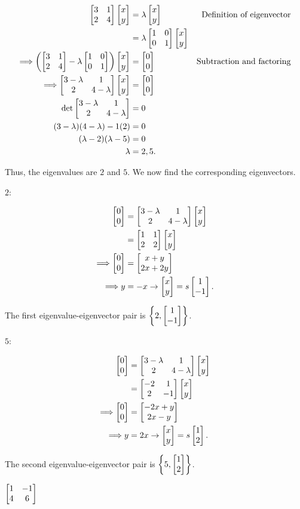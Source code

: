\documentclass[../gatm_answers.tex]{subfiles}
\begin{document}
\begin{align*}
\twomat{3}{1}{2}{4}\twovec{x}{y} &= \lambda\twovec{x}{y} & \text{Definition of eigenvector} \\
&= \lambda\twomat{1}{0}{0}{1}\twovec{x}{y} \\
\Longrightarrow \left(\twomat{3}{1}{2}{4}-\lambda\twomat{1}{0}{0}{1}\right)\twovec{x}{y}&=\twovec{0}{0} & \text{Subtraction and factoring} \\
\Longrightarrow \twomat{3-\lambda}{1}{2}{4-\lambda}\twovec{x}{y} &= \twovec{0}{0} \\
\det \twomat{3-\lambda}{1}{2}{4-\lambda} &= 0 \\
(3-\lambda)(4-\lambda)-1(2) &= 0 \\
(\lambda-2)(\lambda-5) &= 0 \\
\lambda &= 2,5.\\
\end{align*}

Thus, the eigenvalues are $2$ and $5$. We now find the corresponding eigenvectors.

$2$:

\begin{align*}
\twovec{0}{0} &= \twomat{3-\lambda}{1}{2}{4-\lambda}\twovec{x}{y} \\
&= \twomat{1}{1}{2}{2}\twovec{x}{y} \\
\Longrightarrow \twovec{0}{0} &= \twovec{x+y}{2x+2y} \\
\Longrightarrow y&=-x \rightarrow \twovec{x}{y}=s\twovec{1}{-1}.
\end{align*}

The first eigenvalue-eigenvector pair is $\left\{2, \twovec{1}{-1}\right\}$.

$5$:

\begin{align*}
\twovec{0}{0} &= \twomat{3-\lambda}{1}{2}{4-\lambda}\twovec{x}{y} \\
&= \twomat{-2}{1}{2}{-1}\twovec{x}{y} \\
\Longrightarrow \twovec{0}{0} &= \twovec{-2x+y}{2x-y} \\
\Longrightarrow y&=2x \rightarrow \twovec{x}{y}=s\twovec{1}{2}.
\end{align*}

The second eigenvalue-eigenvector pair is $\left\{5, \twovec{1}{2}\right\}$.

\begin{inner_problem}
\item $\twomat{1}{-1}{4}{6}$
\end{inner_problem}
\end{document}
